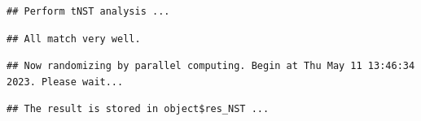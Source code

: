 \documentclass[
]{book}
\newenvironment{Shaded}{\begin{snugshade}}{\end{snugshade}}
\newcommand{\AttributeTok}[1]{\textcolor[rgb]{0.77,0.63,0.00}{#1}}
\newcommand{\CommentTok}[1]{\textcolor[rgb]{0.56,0.35,0.01}{\textit{#1}}}
\newcommand{\ConstantTok}[1]{\textcolor[rgb]{0.00,0.00,0.00}{#1}}
\newcommand{\FunctionTok}[1]{\textcolor[rgb]{0.00,0.00,0.00}{#1}}
\newcommand{\NormalTok}[1]{#1}
\newcommand{\SpecialCharTok}[1]{\textcolor[rgb]{0.00,0.00,0.00}{#1}}
\newcommand{\StringTok}[1]{\textcolor[rgb]{0.31,0.60,0.02}{#1}}
\begin{document}
\begin{Shaded}
\end{Shaded}

\begin{verbatim}
## Perform tNST analysis ...
\end{verbatim}

\begin{verbatim}
## All match very well.
\end{verbatim}

\begin{verbatim}
## Now randomizing by parallel computing. Begin at Thu May 11 13:46:34 2023. Please wait...
\end{verbatim}

\begin{verbatim}
## The result is stored in object$res_NST ...
\end{verbatim}
\end{document}

